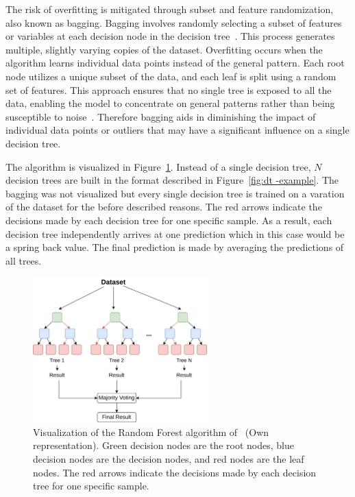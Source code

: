 The risk of overfitting is mitigated through subset and feature randomization, also known as bagging.
Bagging involves randomly selecting a subset of features or variables at each decision node in the decision
tree~\cite[p. 341]{gareth2013introduction}.
This process generates multiple, slightly varying copies of the dataset.
Overfitting occurs when the algorithm learns individual data points instead of
the general pattern.
Each root node utilizes a unique subset of the data, and each leaf is split using a random set of features.
This approach ensures that no single tree is exposed to all the data, enabling the model to concentrate on general
patterns rather than being susceptible to noise~\cite[p. 251]{liu_newmachinelearning_2012}.
Therefore bagging aids in diminishing the impact of individual data points or outliers that may have a
significant influence on a single decision tree.

The algorithm is visualized in Figure~\ref{fig:rf-example}.
Instead of a single decision tree, $N$ decision trees are built in the format described in Figure~\ref{fig:dt -example}.
The bagging was not visualized but every single decision tree is trained on a varation of the dataset for the before
described reasons.
The red arrows indicate the decisions made by each decision tree for one specific sample.
As a result, each decision tree independently arrives at one prediction which in this case would be a spring back value.
The final prediction is made by averaging the predictions of all trees.

\begin{figure}[h]
    \begin{tcolorbox}[arc=0pt,boxrule=0.5pt]
        \centering
        \includegraphics[width=0.6\textwidth]{chap4/images/random_forest_example}
    \end{tcolorbox}
    \caption{Visualization of the Random Forest algorithm of~\cite[p.1]{breiman_randomforests_2001} (Own
    representation).
    Green decision nodes are the root nodes, blue decision nodes are the decision nodes, and red nodes are the leaf
    nodes.
    The red arrows indicate the decisions made by each decision tree for one specific sample.}
    \label{fig:rf-example}
\end{figure}

